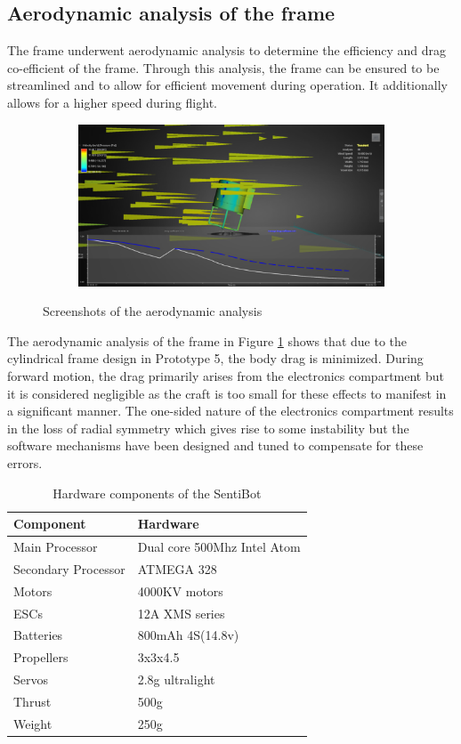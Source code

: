 \documentclass[12pt]{article}
\begin{document}
\subsection{Aerodynamic analysis of the frame}
The frame underwent aerodynamic analysis to determine the efficiency and drag co-efficient of the frame. Through this analysis, the frame can be ensured to be streamlined and to allow for efficient movement during operation. It additionally allows for a higher speed during flight.

\begin{figure}[h]
	\centering
	\begin{subfigure}{0.5\textwidth}
		\centering
		\includegraphics[width=0.9\linewidth]{aerodynamic-1.png}
	\end{subfigure}
	\caption{Screenshots of the aerodynamic analysis}
	\label{fig:aerodynamic}
\end{figure}

The aerodynamic analysis of the frame in Figure \ref{fig:aerodynamic} shows that due to the cylindrical frame design in Prototype 5, the body drag is minimized. During forward motion, the drag primarily arises from the electronics compartment but it is considered negligible as the craft is too small for these effects to manifest in a significant manner. The one-sided nature of the electronics compartment results in the loss of radial symmetry which gives rise to some instability but the software mechanisms have been designed and tuned to compensate for these errors. 

\begin{table}[h]
	\centering
	\begin{tabular}{ | l | l | }
		Component & Hardware \\
		\hline
		Main Processor & Dual core 500Mhz Intel Atom \\
		Secondary Processor & ATMEGA 328 \\
		Motors & 4000KV motors \\
		ESCs & 12A XMS series \\
		Batteries & 800mAh 4S(14.8v) \\
		Propellers & 3x3x4.5 \\
		Servos & 2.8g ultralight \\
		Thrust & 500g \\
		Weight & 250g \\
	\end{tabular}
	\caption{Hardware components of the SentiBot}
	\label{fig:components}
\end{table}
\end{document}
